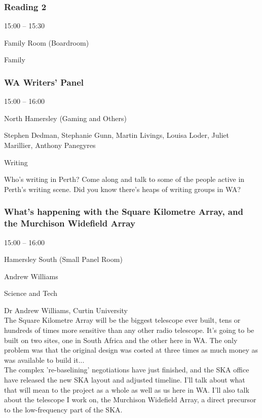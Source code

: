 \documentclass{scrreprt}
\begin{document}
\begin{multicols}{2}
\subsubsection*{Reading 2}\begin{description}
\setlength{\itemsep}{0pt}
\setlength{\parsep}{0pt}
\setlength{\parskip}{0pt}
\item[Time:]{15:00 -- 15:30}
\item[Venue:]{Family Room (Boardroom)}
\item[Tags:]{Family}\end{description}

\subsubsection*{WA Writers' Panel}\begin{description}
\setlength{\itemsep}{0pt}
\setlength{\parsep}{0pt}
\setlength{\parskip}{0pt}
\item[Time:]{15:00 -- 16:00}
\item[Venue:]{North Hamersley (Gaming and Others)}
\item[People:]{Stephen Dedman, Stephanie Gunn, Martin Livings, Louisa Loder, Juliet Marillier, Anthony Panegyres}
\item[Tags:]{Writing}\end{description}
Who's writing in Perth? Come along and talk to some of the people active in Perth's writing scene. Did you know there's heaps of writing groups in WA?
\subsubsection*{What's happening with the Square Kilometre Array, and the Murchison Widefield Array}\begin{description}
\setlength{\itemsep}{0pt}
\setlength{\parsep}{0pt}
\setlength{\parskip}{0pt}
\item[Time:]{15:00 -- 16:00}
\item[Venue:]{Hamersley South (Small Panel Room)}
\item[People:]{Andrew Williams}
\item[Tags:]{Science and Tech}\end{description}
Dr Andrew Williams, Curtin University\\The Square Kilometre Array will be the biggest telescope ever built, tens or hundreds of times more sensitive than any other radio telescope. It's going to be built on two sites, one in South Africa and the other here in WA. The only problem was that the original design was costed at three times as much money as was available to build it...\\The complex 're-baselining' negotiations have just finished, and the SKA office have released the new SKA layout and adjusted timeline. I'll talk about what that will mean to the project as a whole as well as us here in WA. I'll also talk about the telescope I work on, the Murchison Widefield Array, a direct precursor to the low-frequency part of the SKA.

\end{multicols}
\end{document}
